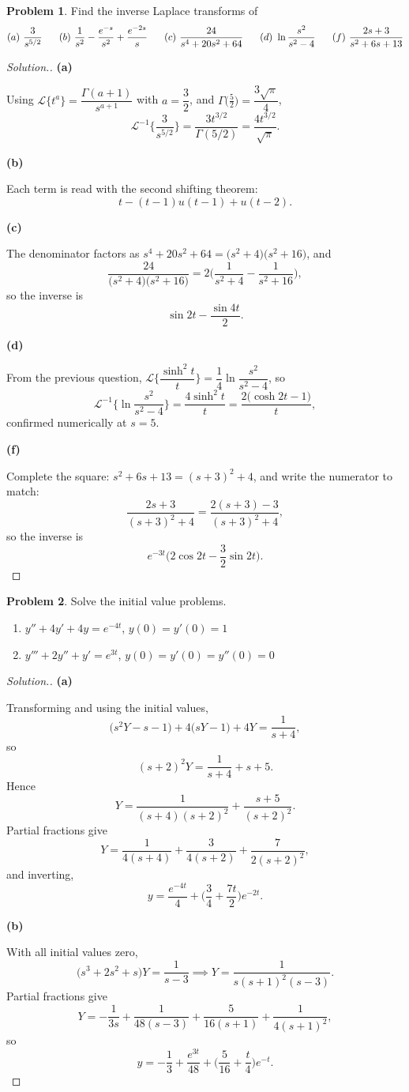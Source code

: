 \documentclass[11pt,a4paper]{article}
\theoremstyle{definition}
\newtheorem{problemx}{Problem}[subsection]
\newenvironment{problem}{\begin{problemx}}{\end{problemx}}
\newenvironment{solution}
  {\renewcommand{\qedsymbol}{}\begin{proof}[\textit{Solution}.]}
  {\end{proof}}
\newcommand{\subhead}[1]{%
  \par\medskip\noindent\textbf{#1}\par\nobreak\smallskip}
\begin{document}
\begin{problem}
Find the inverse Laplace transforms of
$$(a)\ \frac{3}{s^{5/2}}\hspace{0.6cm}
(b)\ \frac{1}{s^2}-\frac{e^{-s}}{s^2}+\frac{e^{-2s}}{s}\hspace{0.6cm}
(c)\ \frac{24}{s^4+20s^2+64}\hspace{0.6cm}
(d)\ \ln\frac{s^2}{s^2-4}\hspace{0.6cm}
(f)\ \frac{2s+3}{s^2+6s+13}$$
\end{problem}
\begin{solution}
\subhead{(a)}
Using $\mathcal{L}\{t^a\} = \dfrac{\Gamma(a+1)}{s^{a+1}}$ with
$a = \dfrac32$, and $\Gamma\big(\tfrac52\big) = \dfrac{3\sqrt\pi}{4}$,
$$\mathcal{L}^{-1}\Big\{\frac{3}{s^{5/2}}\Big\}
= \frac{3t^{3/2}}{\Gamma(5/2)} = \frac{4t^{3/2}}{\sqrt\pi}.$$

\subhead{(b)}
Each term is read with the second shifting theorem:
$$t - (t-1)u(t-1) + u(t-2).$$

\subhead{(c)}
The denominator factors as
$s^4+20s^2+64 = \big(s^2+4\big)\big(s^2+16\big)$, and
$$\frac{24}{\big(s^2+4\big)\big(s^2+16\big)}
= 2\Big(\frac{1}{s^2+4} - \frac{1}{s^2+16}\Big),$$
so the inverse is
$$\sin 2t - \frac{\sin 4t}{2}.$$

\subhead{(d)}
From the previous question,
$\mathcal{L}\Big\{\dfrac{\sinh^2t}{t}\Big\} = \dfrac14\ln\dfrac{s^2}{s^2-4}$,
so
$$\mathcal{L}^{-1}\Big\{\ln\frac{s^2}{s^2-4}\Big\}
= \frac{4\sinh^2t}{t} = \frac{2\big(\cosh 2t-1\big)}{t},$$
confirmed numerically at $s=5$.

\subhead{(f)}
Complete the square: $s^2+6s+13 = (s+3)^2+4$, and write the numerator to match:
$$\frac{2s+3}{(s+3)^2+4} = \frac{2(s+3)-3}{(s+3)^2+4},$$
so the inverse is
$$e^{-3t}\Big(2\cos 2t - \frac32\sin 2t\Big).$$
\end{solution}

\begin{problem}
Solve the initial value problems.
\begin{enumerate}
\item[(a)] $y''+4y'+4y = e^{-4t}$, $y(0)=y'(0)=1$
\item[(b)] $y'''+2y''+y' = e^{3t}$, $y(0)=y'(0)=y''(0)=0$
\end{enumerate}
\end{problem}
\begin{solution}
\subhead{(a)}
Transforming and using the initial values,
$$\big(s^2Y-s-1\big) + 4\big(sY-1\big) + 4Y = \frac{1}{s+4},$$
so
$$(s+2)^2Y = \frac{1}{s+4} + s + 5 .$$
Hence
$$Y = \frac{1}{(s+4)(s+2)^2} + \frac{s+5}{(s+2)^2}.$$
Partial fractions give
$$Y = \frac{1}{4(s+4)} + \frac{3}{4(s+2)} + \frac{7}{2(s+2)^2},$$
and inverting,
$$y = \frac{e^{-4t}}{4} + \Big(\frac34 + \frac{7t}{2}\Big)e^{-2t}.$$

\subhead{(b)}
With all initial values zero,
$$\big(s^3+2s^2+s\big)Y = \frac{1}{s-3}
\implies Y = \frac{1}{s(s+1)^2(s-3)}.$$
Partial fractions give
$$Y = -\frac{1}{3s} + \frac{1}{48(s-3)} + \frac{5}{16(s+1)} + \frac{1}{4(s+1)^2},$$
so
$$y = -\frac13 + \frac{e^{3t}}{48} + \Big(\frac{5}{16} + \frac{t}{4}\Big)e^{-t}.$$
\end{solution}
\end{document}
